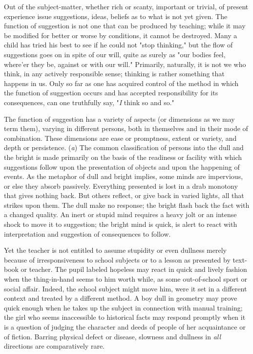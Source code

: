 \documentclass[showtrims,ustradepaper]{memoir}
\begin{document}
Out of the subject-matter, whether rich or scanty, important or trivial,
of present experience issue suggestions, ideas, beliefs as to what is
not yet given. The function of suggestion is not one that can be
produced by teaching; while it may be modified for better or worse by
conditions, it cannot be destroyed. Many a child has tried his best to
see if he could not "stop thinking," but the flow of suggestions goes on
in spite of our will, quite as surely as "our bodies feel, where'er they
be, against or with our will." Primarily, naturally, it is not we who
think, in any actively responsible sense; thinking is rather something
that happens in us. Only so far as one has acquired control of the
method in which the function of suggestion occurs and has accepted
responsibility for its consequences, can one truthfully say, "\emph{I}
think so and so."



The function of suggestion has a variety of aspects (or dimensions as we
may term them), varying in different persons, both in themselves and in
their mode of combination. These dimensions are ease or promptness,
extent or variety, and depth or persistence. (\emph{a}) The common
classification of persons into the dull and the bright is made primarily
on the basis of the readiness or facility with which suggestions follow
upon the
presentation
of objects and upon the happening of events. As the metaphor of dull and
bright implies, some minds are impervious, or else they absorb
passively. Everything presented is lost in a drab monotony that gives
nothing back. But others reflect, or give back in varied lights, all
that strikes upon them. The dull make no response; the bright flash back
the fact with a changed quality. An inert or stupid mind requires a
heavy jolt or an intense shock to move it to suggestion; the bright mind
is quick, is alert to react with interpretation and suggestion of
consequences to follow.

Yet the teacher is not entitled to assume stupidity or even dullness
merely because of irresponsiveness to school subjects or to a lesson as
presented by text-book or teacher. The pupil labeled hopeless may react
in quick and lively fashion when the thing-in-hand seems to him worth
while, as some out-of-school sport or social affair. Indeed, the school
subject might move him, were it set in a different context and treated
by a different method. A boy dull in geometry may prove quick enough
when he takes up the subject in connection with manual training; the
girl who seems inaccessible to historical facts may respond promptly
when it is a question of judging the character and deeds of people of
her acquaintance or of fiction. Barring physical defect or disease,
slowness and dullness in \emph{all} directions are comparatively rare.
\end{document}
